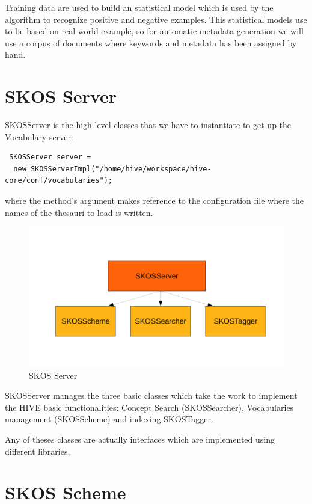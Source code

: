 Training data are used to build an statistical model which is used by the algorithm to recognize positive and negative examples. This statistical models use to 
be based on real world example, so for automatic metadata generation we will use a corpus of documents where keywords and metadata has been assigned by hand.

\section{SKOS Server}


SKOSServer is the high level classes that we have to instantiate to get up the Vocabulary server:

\begin{verbatim}
 SKOSServer server = 
  new SKOSServerImpl("/home/hive/workspace/hive-core/conf/vocabularies");
\end{verbatim}
 
where the method's argument makes reference to the configuration file where the names of the thesauri to load is written.

\begin{figure}
\centering
\includegraphics[width=400pt]{img/skosserver.pdf}
\caption{SKOS Server}
\label{skosserver}
\end{figure}

SKOSServer manages the three basic classes which take the work to implement the HIVE basic functionalities: Concept Search 
(SKOSSearcher), Vocabularies management (SKOSScheme) and indexing SKOSTagger.

Any of theses classes are actually interfaces which are implemented using different libraries,

\section{SKOS Scheme}

